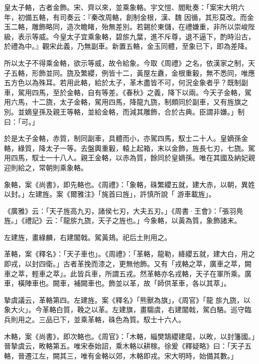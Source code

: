 \begin{pinyinscope}
 皇太子輅，古者金飾。宋、齊以來，並乘象輅。宇文愷、閻毗奏：「案宋大明六年，初備五輅，有司奏云：『秦改周輅，創制金根，漢、魏
 因循，其形莫改。而金玉二輅，雕飾略同，造次瞻睹，殆無差別。若錫於東儲，在禮嫌重，非所以崇峻陛級，表示等威。今皇太子宜乘象輅，碧旂九葉，進不斥尊，退不逼下，酌時沿古，於禮為中。』觀宋此義，乃無副車。新置五輅，金玉同體，至象已下，即為差降。



 所以太子不得乘金輅，欲示等威，故令給象。今取《周禮》之名，依漢家之制，天子五輅，形飾並同。旒及繁纓，例皆十二，黃屋左纛，金根重轂，無不悉同，唯應五方色以為殊耳。若用此輅，給於太子，革木盡皆不可，何況金象者乎？既制副車，駕用四馬，至於金輅，自有等差。《春秋》之義，降下以兩。今天子金輅，駕
 用六馬，十二旒，太子金輅，駕用四馬，降龍九旒，制頗同於副車，又有旌旗之別。並嫡皇孫及親王等輅，並給金輅，而減其雕飾，合於古典。臣謂非嫌。」制曰：「可。」



 於是太子金輅，赤質，制同副車，具體而小，亦駕四馬，馭士二十人。皇嫡孫金輅，綠質，降太子一等。去盤輿重轂，轅上起箱，末以金飾，旌長七刃，七旒。駕用四馬，馭士一十八人。親王金輅，以赤為質，餘同於皇嫡孫。唯在其國及納妃親迎則給之，常朝則乘象輅。



 象輅，案《尚書》，即先輅也。《周禮》：「象輅，硃繁纓五就，建大赤，以朝，異姓以封。」左建旌。案《爾雅注》「旄首曰旌」，許慎所說「
 游車載旌」。



 《廣雅》云：「天子旌高九刃，諸侯七刃，大夫五刃。」《周書·王會》：「張羽鳧旌。」《禮記》云：「龍旂九旒，天子之旌也。」今象輅，以黃為質，象飾諸末。



 左建旌，畫綠麟，右建闟戟。駕黃鳷。祀后土則用之。



 革輅，案《釋名》：「天子車也」。《周禮》：「革輅，龍勒，絳纓五就，建大白，用之即戎，以封四衛。」古者革挽而漆之，更無他飾。又有「戎輅之萃，廣車之萃，闕車之萃，輕車之萃」。此皆兵車，所謂五戎。然革輅亦名戎輅，天子在軍所乘。廣車，橫陣車也。闕車，補闕車也。飾並以革，故「師供革車，各以其萃」。



 摯虞議云，革輅第四。左建旌。案《釋名》「熊獸為旗」，《周官》「龍
 旂九旒，以象大火」。今革輅白質，鞔之以革。左建旗，畫騶虞，右建闟戟，駕白駱。巡守臨兵則用之。三品已下，並乘革輅，硃色為質。馭士十六人。



 木輅，案《尚書》，即次輅也。《周官》：「木輅，緇樊鵠纓建麾，以畋，以封籓國。」晉摯虞云，畋輅第五。唯宋泰始詔，乘木輅以耕稼。徐爰《釋疑略》曰：「天子五輅，晉遷江左，闕其三，唯有金輅以郊，木輅即戎。宋大明時，始備其數。」




\end{pinyinscope}
